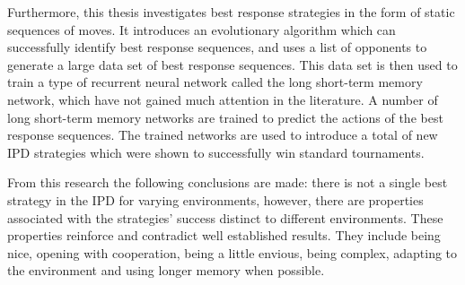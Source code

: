 Furthermore, this thesis investigates best response strategies in the form of
static sequences of moves. It introduces an evolutionary algorithm which can
successfully identify best response sequences, and uses a list of
\numberofstrategiesbestsequences opponents to generate a large data set of best
response sequences. This data set is then used to train a type of recurrent
neural network called the long short-term memory network, which have not gained
much attention in the literature. A number of long short-term memory networks
are trained to predict the actions of the best response sequences. The trained
networks are used to introduce a total of \lstmstrategies new IPD strategies which were shown
to successfully win standard tournaments.

From this research the following conclusions are made: there is not a single
best strategy in the IPD for varying environments, however, there are properties
associated with the strategies' success distinct to different environments.
These properties reinforce and contradict well established results. They include
being nice, opening with cooperation, being a little envious, being complex,
adapting to the environment and using longer memory when possible.